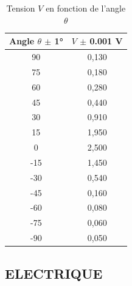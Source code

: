 \begin{table}[h!]
\centering
\begin{tabular}{|c|c|}
\hline
Angle $\theta$ $\pm$ 1° & $V$ $\pm$ 0.001 V \\
\hline
90  & 0,130 \\
75  & 0,180 \\
60  & 0,280 \\
45  & 0,440 \\
30  & 0,910 \\
15  & 1,950 \\
0   & 2,500  \\
-15 & 1,450 \\
-30 & 0,540 \\
-45 & 0,160 \\
-60 & 0,080 \\
-75 & 0,060 \\
-90 & 0,050 \\
\hline
\end{tabular}
\caption{Tension $V$ en fonction de l'angle $\theta$}
\label{tab:angle}
\end{table}





\subsection{ELECTRIQUE}


